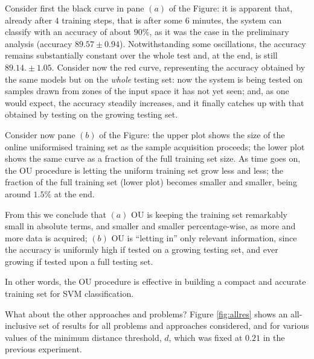 Consider first the black curve in pane $(a)$ of the Figure: it is
apparent that, already after $4$ training steps, that is after some
$6$ minutes, the system can classify with an accuracy of about $90\%$,
as it was the case in the preliminary analysis (accuracy $89.57 \pm
0.94$). Notwithstanding some oscillations, the accuracy remains
substantially constant over the whole test and, at the end, is still
$89.14. \pm 1.05$. Consider now the red curve, representing the
accuracy obtained by the same models but on the \emph{whole} testing
set: now the system is being tested on samples drawn from zones of the
input space it has not yet seen; and, as one would expect, the
accuracy steadily increases, and it finally catches up with that
obtained by testing on the growing testing set.

Consider now pane $(b)$ of the Figure: the upper plot shows the size
of the online uniformised training set as the sample acquisition
proceeds; the lower plot shows the same curve as a fraction of the
full training set size. As time goes on, the OU procedure is letting
the uniform training set grow less and less; the fraction of the full
training set (lower plot) becomes smaller and smaller, being around
$1.5\%$ at the end.

From this we conclude that $(a)$ OU is keeping the training set
remarkably small in absolute terms, and smaller and smaller
percentage-wise, as more and more data is acquired; $(b)$ OU is
``letting in'' only relevant information, since the accuracy is
uniformly high if tested on a growing testing set, and ever growing if
tested upon a full testing set.

In other words, the OU procedure is effective in building a compact and
accurate training set for SVM classification.

What about the other approaches and problems? Figure \ref{fig:allres}
shows an all-inclusive set of results for all problems and approaches
considered, and for various values of the minimum distance threshold,
$d$, which was fixed at $0.21$ in the previous experiment.

